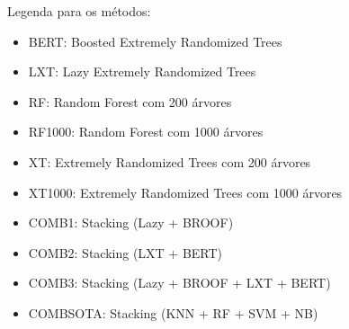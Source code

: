 \documentclass[]{article}
\begin{document}
Legenda para os métodos:

\begin{itemize}
\itemsep1pt\parskip0pt
\item
  BERT: Boosted Extremely Randomized Trees
\item
  LXT: Lazy Extremely Randomized Trees
\item
  RF: Random Forest com 200 árvores
\item
  RF1000: Random Forest com 1000 árvores
\item
  XT: Extremely Randomized Trees com 200 árvores
\item
  XT1000: Extremely Randomized Trees com 1000 árvores
\item
  COMB1: Stacking (Lazy + BROOF)
\item
  COMB2: Stacking (LXT + BERT)
\item
  COMB3: Stacking (Lazy + BROOF + LXT + BERT)
\item
  COMBSOTA: Stacking (KNN + RF + SVM + NB)
\end{itemize}
\end{document}
